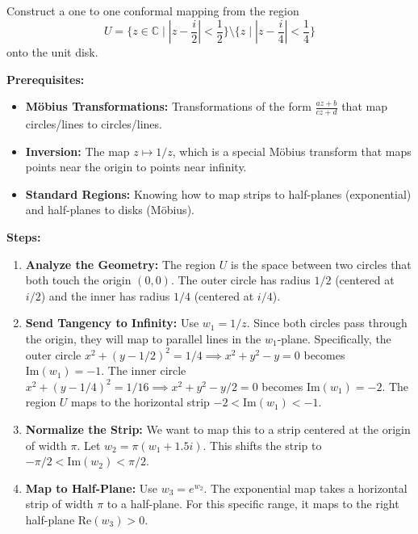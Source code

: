 \begin{exercise}
\label{analysis:2012:2}
Construct a one to one conformal mapping from the region
\[
U = \{z\in\mathbb{C} \mid |z-\frac{i}{2}|<\frac{1}{2}\} \setminus \{z \mid |z-\frac{i}{4}|<\frac{1}{4}\}
\]
onto the unit disk.
\end{exercise}

\begin{solution}
\textbf{Prerequisites:}
\begin{itemize}
    \item \textbf{M\"obius Transformations:} Transformations of the form $\frac{az+b}{cz+d}$ that map circles/lines to circles/lines.
    \item \textbf{Inversion:} The map $z \mapsto 1/z$, which is a special M\"obius transform that maps points near the origin to points near infinity.
    \item \textbf{Standard Regions:} Knowing how to map strips to half-planes (exponential) and half-planes to disks (M\"obius).
\end{itemize}

\bigskip

\textbf{Steps:}
\begin{enumerate}
    \item \textbf{Analyze the Geometry:} The region $U$ is the space between two circles that both touch the origin $(0,0)$. The outer circle has radius $1/2$ (centered at $i/2$) and the inner has radius $1/4$ (centered at $i/4$).
    
    \item \textbf{Send Tangency to Infinity:} Use $w_1 = 1/z$. Since both circles pass through the origin, they will map to parallel lines in the $w_1$-plane. 
    Specifically, the outer circle $x^2 + (y-1/2)^2 = 1/4 \implies x^2+y^2-y=0$ becomes $\text{Im}(w_1) = -1$.
    The inner circle $x^2+(y-1/4)^2=1/16 \implies x^2+y^2-y/2=0$ becomes $\text{Im}(w_1) = -2$.
    The region $U$ maps to the horizontal strip $-2 < \text{Im}(w_1) < -1$.

    \item \textbf{Normalize the Strip:} We want to map this to a strip centered at the origin of width $\pi$.
    Let $w_2 = \pi(w_1 + 1.5i)$. This shifts the strip to $-\pi/2 < \text{Im}(w_2) < \pi/2$.

    \item \textbf{Map to Half-Plane:} Use $w_3 = e^{w_2}$. The exponential map takes a horizontal strip of width $\pi$ to a half-plane. For this specific range, it maps to the right half-plane $\text{Re}(w_3) > 0$.


\end{enumerate}
\end{solution}

